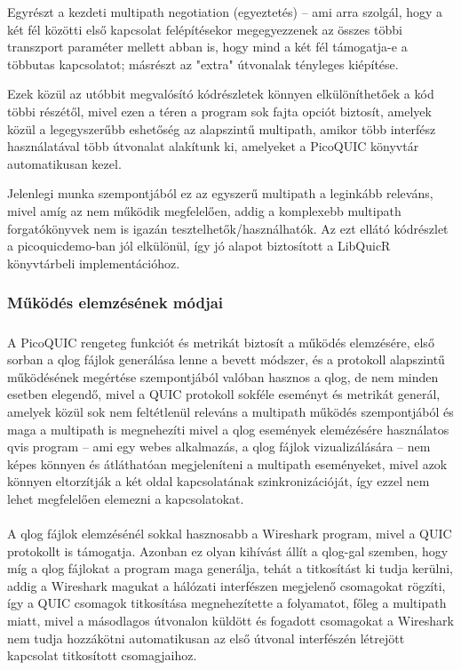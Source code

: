 \documentclass[a4paper,oneside]{article}
\begin{document}
Egyrészt a kezdeti multipath negotiation (egyeztetés) – ami arra szolgál, hogy a két fél közötti első
kapcsolat felépítésekor megegyezzenek az összes többi transzport paraméter mellett abban is, 
hogy mind a két fél támogatja-e a többutas kapcsolatot; másrészt az "extra" útvonalak tényleges kiépítése.

Ezek közül az utóbbit megvalósító kódrészletek könnyen elkülöníthetőek a kód többi részétől, mivel ezen a 
téren a program sok fajta opciót biztosít, amelyek közül a legegyszerűbb eshetőség az alapszintű 
multipath, amikor több interfész használatával több útvonalat alakítunk ki, amelyeket a PicoQUIC könyvtár automatikusan kezel.

Jelenlegi munka szempontjából ez az egyszerű multipath a leginkább releváns,
mivel amíg az nem működik megfelelően, addig a komplexebb multipath forgatókönyvek nem is igazán tesztelhetők/használhatók.
Az ezt ellátó kódrészlet a picoquicdemo-ban jól elkülönül, így jó alapot biztosított a LibQuicR könyvtárbeli implementációhoz.

\subsubsection{Működés elemzésének módjai}

\subparagraph{}

A PicoQUIC rengeteg funkciót és metrikát biztosít a működés elemzésére, 
első sorban a qlog fájlok generálása lenne a bevett módszer, és
a protokoll alapszintű működésének megértése szempontjából valóban hasznos 
a qlog, de nem minden esetben elegendő, mivel a QUIC protokoll
sokféle eseményt és metrikát generál, amelyek közül sok nem feltétlenül releváns a 
multipath működés szempontjából és maga a multipath is megnehezíti mivel a qlog események 
elemézésére használatos qvis program\cite{qvis} – ami egy webes alkalmazás, a qlog 
fájlok vizualizálására – nem képes könnyen és átláthatóan megjeleníteni a multipath 
eseményeket, mivel azok könnyen eltorzítják a két oldal kapcsolatának 
szinkronizációját, így ezzel nem lehet megfelelően elemezni a kapcsolatokat.

\paragraph{}
A qlog fájlok elemzésénél sokkal hasznosabb a Wireshark program, mivel
a QUIC protokollt is támogatja.
Azonban ez olyan kihívást állít a qlog-gal szemben, hogy míg a 
qlog fájlokat a program maga generálja, tehát a titkosítást ki tudja kerülni, 
addig a Wireshark magukat a hálózati interfészen megjelenő csomagokat rögzíti, 
így a QUIC csomagok titkosítása megnehezítette a folyamatot, főleg a multipath 
miatt, mivel a másodlagos útvonalon küldött és fogadott csomagokat a Wireshark 
nem tudja hozzákötni automatikusan az első útvonal interfészén létrejött kapcsolat titkosított csomagjaihoz.
\end{document}
